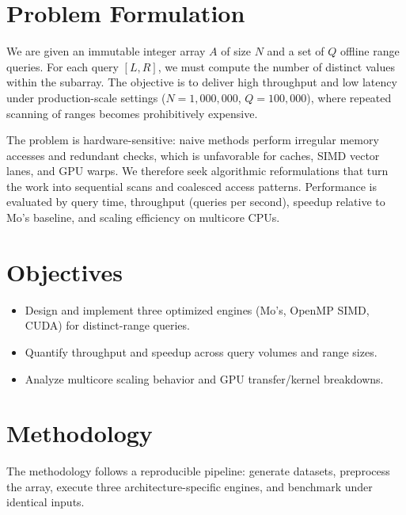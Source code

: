 \documentclass[12pt,a4paper]{article}
\begin{document}
	\newpage
	\section{Problem Formulation}
	We are given an immutable integer array $A$ of size $N$ and a set of $Q$ offline range queries. For each query $[L,R]$, we must compute the number of distinct values within the subarray. The objective is to deliver high throughput and low latency under production-scale settings ($N=1{,}000{,}000$, $Q=100{,}000$), where repeated scanning of ranges becomes prohibitively expensive.
	
	The problem is hardware-sensitive: naive methods perform irregular memory accesses and redundant checks, which is unfavorable for caches, SIMD vector lanes, and GPU warps. We therefore seek algorithmic reformulations that turn the work into sequential scans and coalesced access patterns. Performance is evaluated by query time, throughput (queries per second), speedup relative to Mo's baseline, and scaling efficiency on multicore CPUs.
	\newpage
%	
%	
	\section{Objectives}
	\begin{itemize}
	\item Design and implement three optimized engines (Mo's, OpenMP SIMD, CUDA) for distinct-range queries.
	\item Quantify throughput and speedup across query volumes and range sizes.
	\item Analyze multicore scaling behavior and GPU transfer/kernel breakdowns.
	\end{itemize}
	
	\newpage
	
	
	\section{Methodology}
	The methodology follows a reproducible pipeline: generate datasets, preprocess the array, execute three architecture-specific engines, and benchmark under identical inputs.
	
\end{document}
